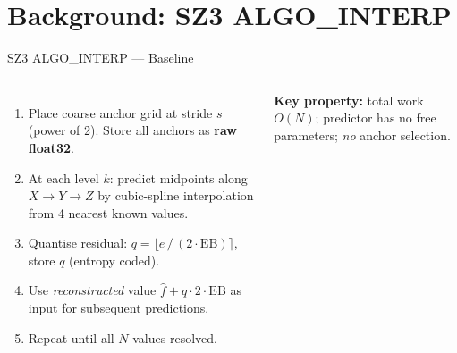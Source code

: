 \documentclass[10pt]{beamer}
\begin{document}
\section{Background: SZ3 ALGO\_INTERP}
\begin{frame}{SZ3 ALGO\_INTERP --- Baseline}
  \begin{columns}
    \begin{enumerate}
      \item Place coarse anchor grid at stride $s$ (power of 2).
            Store all anchors as \textbf{raw float32}.
      \item At each level $k$: predict midpoints along $X\!\to\!Y\!\to\!Z$
            by cubic-spline interpolation from 4 nearest known values.
      \item Quantise residual:
            $q = \lfloor e\,/\,(2\cdot\mathrm{EB})\rceil$,\;
            store $q$ (entropy coded).
      \item Use \emph{reconstructed} value $\hat{f}+q\cdot2\cdot\mathrm{EB}$
            as input for subsequent predictions.
      \item Repeat until all $N$ values resolved.
    \end{enumerate}
    \vspace{4pt}
    \textbf{Key property:} total work $O(N)$; predictor has no
    free parameters; \emph{no} anchor selection.
  \end{columns}
\end{frame}

\end{document}
